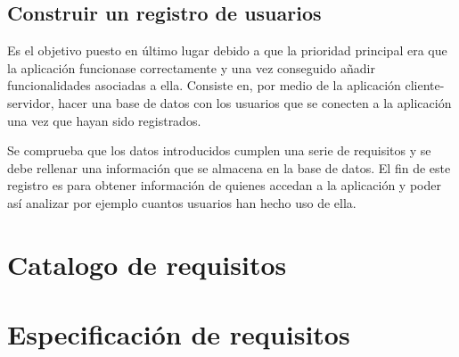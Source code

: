 \subsection{Construir un registro de usuarios}

Es el objetivo puesto en último lugar debido a que la prioridad principal era que la aplicación funcionase correctamente y una vez conseguido añadir funcionalidades asociadas a ella. Consiste en, por medio de la aplicación cliente-servidor, hacer una base de datos con los usuarios que se conecten a la aplicación una vez que hayan sido registrados.

Se comprueba que los datos introducidos cumplen una serie de requisitos y se debe rellenar una información que se almacena en la base de datos.
El fin de este registro es para obtener información de quienes accedan a la aplicación y poder así analizar por ejemplo cuantos usuarios han hecho uso de ella.

\section{Catalogo de requisitos}

\section{Especificación de requisitos}


